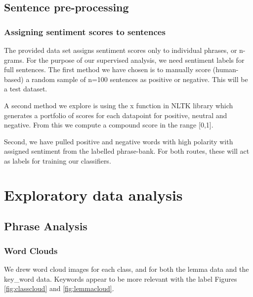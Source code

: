 \documentclass[10pt, a4paper]{article}
\begin{document}
\subsection{Sentence pre-processing}

\subsubsection{Assigning sentiment scores to sentences}
The provided data set assigns sentiment scores only to individual phrases, or n-grams. For the purpose of our supervised analysis, we need sentiment labels for full sentences. The first method we have chosen is to manually score (human-based) a random sample of n=100 sentences as positive or negative. This will be a test dataset.

A second method we explore is using the x function in NLTK library which generates a portfolio of scores for each datapoint for positive, neutral and negative. From this we compute a compound score in the range [0,1]. 





Second, we have pulled positive and negative words with high polarity with assigned sentiment from the labelled phrase-bank. For both routes, these will act as labels for training our classifiers. 










\section{Exploratory data analysis}

\subsection{Phrase Analysis}
\subsubsection{Word Clouds}
We drew word cloud images for each class, and for both the lemma data and the key\_word data. Keywords appear to be more relevant with the label Figures \ref{fig:classcloud} and \ref{fig:lemmacloud}.
\end{document}
